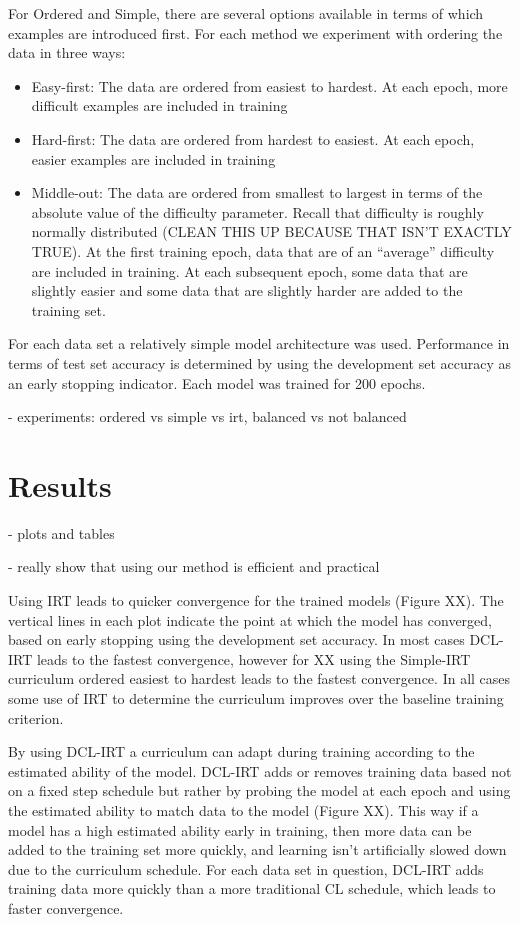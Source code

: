 \documentclass[letterpaper]{article} %
\begin{document}
For Ordered and Simple, there are several options available in terms of which examples are introduced first.
For each method we experiment with ordering the data in three ways:
\begin{itemize}
	\item 
	Easy-first: The data are ordered from easiest to hardest. At each epoch, more difficult examples are included in training
	\item 
	Hard-first: The data are ordered from hardest to easiest. At each epoch, easier examples are included in training
	\item 
	Middle-out: The data are ordered from smallest to largest in terms of the absolute value of the difficulty parameter. Recall that difficulty is roughly normally distributed (CLEAN THIS UP BECAUSE THAT ISN'T EXACTLY TRUE). At the first training epoch, data that are of an ``average'' difficulty are included in training. At each subsequent epoch, some data that are slightly easier and some data that are slightly harder are added to the training set.
\end{itemize}

For each data set a relatively simple model architecture was used.
Performance in terms of test set accuracy is determined by using the development set accuracy as an early stopping indicator.
Each model was trained for 200 epochs. 

- experiments: ordered vs simple vs irt, balanced vs not balanced 

\section{Results} 

- plots and tables 

- really show that using our method is efficient and practical 

Using IRT leads to quicker convergence for the trained models (Figure XX).
The vertical lines in each plot indicate the point at which the model has converged, based on early stopping using the development set accuracy.
In most cases DCL-IRT leads to the fastest convergence, however for XX using the Simple-IRT curriculum ordered easiest to hardest leads to the fastest convergence.
In all cases some use of IRT to determine the curriculum improves over the baseline training criterion. 

By using DCL-IRT a curriculum can adapt during training according to the estimated ability of the model.
DCL-IRT adds or removes training data based not on a fixed step schedule but rather by probing the model at each epoch and using the estimated ability to match data to the model (Figure XX).
This way if a model has a high estimated ability early in training, then more data can be added to the training set more quickly, and learning isn't artificially slowed down due to the curriculum schedule.
For each data set in question, DCL-IRT adds training data more quickly than a more traditional CL schedule, which leads to faster convergence.
\end{document}
